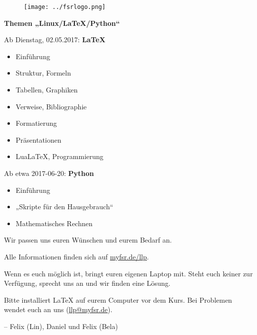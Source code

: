 \documentclass[12pt]{scrartcl}
\newcommand{\chsep}{-2ex}
\begin{document}
  \centering
  \begin{figure}[t]
    \flushright
    \texttt{[image: ../fsrlogo.png]}
  \end{figure}
  {\Huge \textbf{
  Themen „Linux/\LaTeX/Python“}}
  \vspace{0.5cm}

  {\Large Ab Dienstag, 02.05.2017: \textbf{\LaTeX}
  \begin{itemize}%
    \item Einführung
       \item Struktur, Formeln
       \item Tabellen, Graphiken
       \item Verweise, Bibliographie
    \item Formatierung
    \item Präsentationen
    \item Lua\LaTeX, Programmierung
  \end{itemize}
  Ab etwa 2017-06-20: \textbf{Python}
  \begin{itemize}%
    \item Einführung
    \item „Skripte für den Hausgebrauch“
    \item Mathematisches Rechnen
  \end{itemize}
  Wir passen uns euren Wünschen und eurem Bedarf an.

  Alle Informationen finden sich auf \url{myfsr.de/llp}.

  Wenn es euch möglich ist, bringt euren eigenen Laptop mit. Steht euch
keiner zur Verfügung, sprecht uns an und wir finden eine Lösung.

  Bitte installiert \LaTeX{} auf eurem Computer vor dem Kurs. Bei Problemen wendet euch an uns (\url{llp@myfsr.de}).}

  \vspace{2ex}
  
  -- Felix (Lin), Daniel und Felix (Bela)
\end{document}
